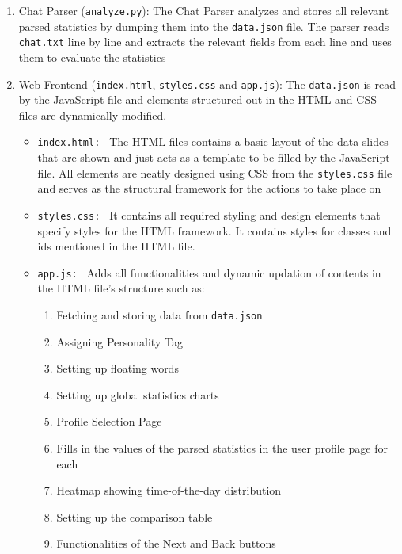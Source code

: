 \documentclass[12pt]{extarticle}
\begin{document}
\begin{enumerate}
\begin{itemize}
        \item \textbf{Long Vocabulary User: } Uses long words (defined as having length $\ge$ 12) very frequently in their messages
        \item \textbf{Editor: } Often (relative to others) edits their message which is characterised by the addition of ``[THIS MESSAGE WAS EDITED]" string after the message in the chat generator
        \item \textbf{Best Friends Pair: } A pair of Best Friends characterised by having the highest number of mutual direct replies. A direct reply is characterised by being the next adjacent message to the message being referred to
    \end{itemize}
    \item Chat Parser (\texttt{analyze.py}): The Chat Parser analyzes and stores all relevant parsed statistics by dumping them into the \texttt{data.json} file. The parser reads \texttt{chat.txt} line by line and extracts the relevant fields from each line and uses them to evaluate the statistics
    \item Web Frontend (\texttt{index.html}, \texttt{styles.css} and \texttt{app.js}): The \texttt{data.json} is read by the JavaScript file and elements structured out in the HTML and CSS files are dynamically modified.
    \begin{itemize}
        \item \texttt{index.html: } The HTML files contains a basic layout of the data-slides that are shown and just acts as a template to be filled by the JavaScript file. All elements are neatly designed using CSS from the \texttt{styles.css} file and serves as the structural framework for the actions to take place on
        \item \texttt{styles.css: } It contains all required styling and design elements that specify styles for the HTML framework. It contains styles for classes and ids mentioned in the HTML file.
        \item \texttt{app.js: } Adds all functionalities and dynamic updation of contents in the HTML file's structure such as:
        \begin{enumerate}
            \item Fetching and storing data from \texttt{data.json}
            \item Assigning Personality Tag
            \item Setting up floating words
            \item Setting up global statistics charts
            \item Profile Selection Page
            \item Fills in the values of the parsed statistics in the user profile page for each
            \item Heatmap showing time-of-the-day distribution
            \item Setting up the comparison table
            \item Functionalities of the Next and Back buttons
        \end{enumerate}
    \end{itemize}
\end{enumerate}
\end{document}
